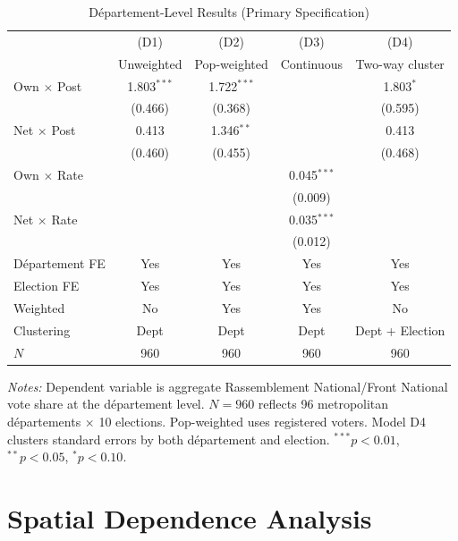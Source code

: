 \documentclass[12pt]{article}
\newcommand{\rn}{Rassemblement National}
\newcommand{\fn}{Front National}
\newcommand{\dept}{d\'{e}partement}
\newcommand{\depts}{d\'{e}partements}
\begin{document}
\begin{table}[H]
\centering
\caption{D\'{e}partement-Level Results (Primary Specification)}
\label{tab:dept}
\begin{threeparttable}
\begin{tabular}{@{}lcccc@{}}
\toprule
 & (D1) & (D2) & (D3) & (D4) \\
 & Unweighted & Pop-weighted & Continuous & Two-way cluster \\
\midrule
Own $\times$ Post & 1.803$^{***}$ & 1.722$^{***}$ & & 1.803$^{*}$ \\
 & (0.466) & (0.368) & & (0.595) \\[3pt]
Net $\times$ Post & 0.413 & 1.346$^{**}$ & & 0.413 \\
 & (0.460) & (0.455) & & (0.468) \\[3pt]
Own $\times$ Rate & & & 0.045$^{***}$ & \\
 & & & (0.009) & \\[3pt]
Net $\times$ Rate & & & 0.035$^{***}$ & \\
 & & & (0.012) & \\[3pt]
\midrule
D\'{e}partement FE & Yes & Yes & Yes & Yes \\
Election FE & Yes & Yes & Yes & Yes \\
Weighted & No & Yes & Yes & No \\
Clustering & Dept & Dept & Dept & Dept + Election \\
$N$ & 960 & 960 & 960 & 960 \\
\bottomrule
\end{tabular}
\begin{tablenotes}
\small
\item \textit{Notes:} Dependent variable is aggregate \rn{}/\fn{} vote share at the \dept{} level. $N = 960$ reflects 96 metropolitan \depts{} $\times$ 10 elections. Pop-weighted uses registered voters. Model D4 clusters standard errors by both \dept{} and election. $^{***}p<0.01$, $^{**}p<0.05$, $^{*}p<0.10$.
\end{tablenotes}
\end{threeparttable}
\end{table}



\section{Spatial Dependence Analysis}
\label{sec:structural}
\label{sec:spatial}
\end{document}
